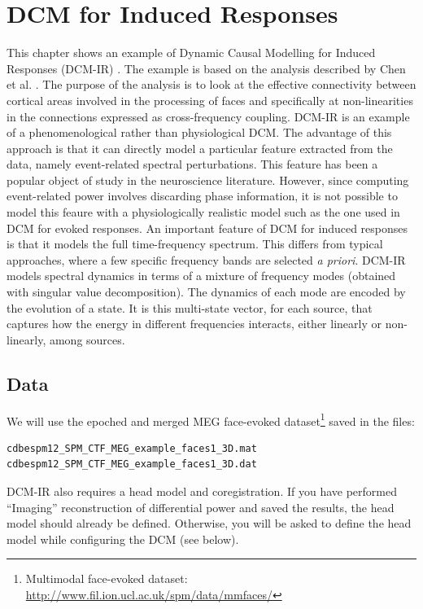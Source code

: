 \chapter{DCM for Induced Responses \label{Chap:data:dcm_ir}}

This chapter shows an example of Dynamic Causal Modelling for Induced Responses (DCM-IR) \cite{cc_induced}. The example is based on the analysis described by Chen et al. \cite{cc_asymm}. The purpose of the analysis is to look at the effective connectivity between cortical areas involved in the processing of faces and specifically at non-linearities in the connections expressed as cross-frequency coupling. DCM-IR is an example of a phenomenological rather than physiological DCM. The advantage of this approach is that it can directly model a particular feature extracted from the data, namely event-related spectral perturbations. This feature has been a popular object of study in the neuroscience literature. However, since computing event-related power involves discarding phase information, it is not possible to model this feaure with a physiologically realistic model such as the one used in DCM for evoked responses. An important feature of DCM for induced responses is that it models the full time-frequency spectrum. This differs from typical approaches, where a few specific frequency bands are selected \textit{a priori}. DCM-IR models spectral dynamics in terms of a mixture of frequency modes (obtained with singular value decomposition). The dynamics of each mode are encoded by the evolution of a state. It is this multi-state vector, for each source, that captures how the energy in different frequencies interacts, either linearly or non-linearly, among sources.

\section{Data}

We will use the epoched and merged MEG face-evoked dataset\footnote{Multimodal face-evoked dataset: \url{http://www.fil.ion.ucl.ac.uk/spm/data/mmfaces/}} saved in the files:

\begin{verbatim}
cdbespm12_SPM_CTF_MEG_example_faces1_3D.mat
cdbespm12_SPM_CTF_MEG_example_faces1_3D.dat
\end{verbatim}

DCM-IR also requires a head model and coregistration. If you have performed ``Imaging'' reconstruction of differential power and saved the results, the head model should already be defined. Otherwise, you will be asked to define the head model while configuring the DCM (see below).

